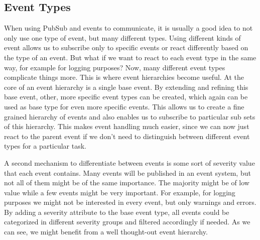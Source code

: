 \subsection{Event Types}

When using PubSub and events to communicate, it is usually a good idea to not only use one type of event, but many different types.
Using different kinds of event allows us to subscribe only to specific events or react differently based on the type of an event.
But what if we want to react to each event type in the same way, for example for logging purposes?
Now, many different event types complicate things more.
This is where event hierarchies become useful.
At the core of an event hierarchy is a single base event.
By extending and refining this base event, other, more specific event types can be created, which again can be used as base type for even more specific events.
This allows us to create a fine grained hierarchy of events and also enables us to subscribe to particular sub sets of this hierarchy.
This makes event handling much easier, since we can now just react to the parent event if we don't need to distinguish between different event types for a particular task.

A second mechanism to differentiate between events is some sort of severity value that each event contains.
Many events will be published in an event system, but not all of them might be of the same importance.
The majority might be of low value while a few events might be very important.
For example, for logging purposes we might not be interested in every event, but only warnings and errors.
By adding a severity attribute to the base event type, all events could be categorized in different severity groups and filtered accordingly if needed.
As we can see, we might benefit from a well thought-out event hierarchy.

